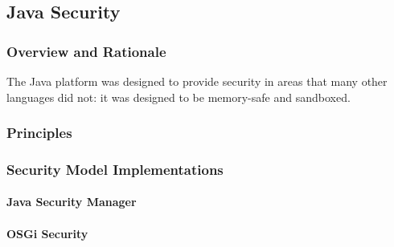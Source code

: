 \subsection{Java Security}

\subsubsection{Overview and Rationale}

The Java platform was designed to provide security in areas that many other languages did not: it was designed to be memory-safe and sandboxed.

\subsubsection{Principles}

\subsubsection{Security Model Implementations}

	\paragraph{Java Security Manager}
	
	\paragraph{OSGi Security}
	
	\cite{philippov2012security}